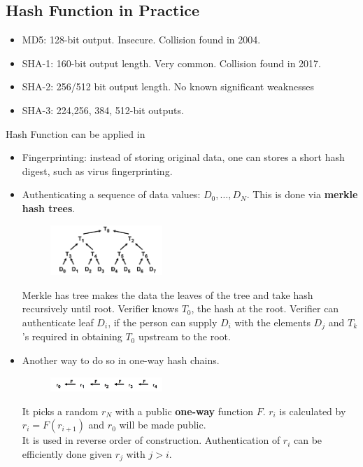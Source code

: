 \documentclass[12pt]{article}
\theoremstyle{definition}
\begin{document}
\subsection{Hash Function in Practice}
\begin{itemize}
  \item MD5: 128-bit output. Insecure. Collision found in 2004.
  \item SHA-1: 160-bit output length. Very common. Collision found in 2017.
  \item SHA-2: 256/512 bit output length. No known significant weaknesses
  \item SHA-3: 224,256, 384, 512-bit outputs.
\end{itemize}
Hash Function can be applied in 
\begin{itemize}
  \item Fingerprinting: instead of storing original data, one can stores a short hash digest, such as virus fingerprinting.
  \item Authenticating a sequence of data values: $D_0,\ldots, D_N$. This is done via \textbf{merkle hash trees}.\\
  \begin{figure}[h]
  \centering
  \includegraphics[width=0.4\textwidth]{5.png}
  \end{figure}
  Merkle has tree makes the data the leaves of the tree and take hash recursively until root. Verifier knows $T_0$, the hash at the root. Verifier can authenticate leaf $D_i$, if the person can supply $D_i$ with the elements $D_j$ and $T_k$'s required in obtaining $T_0$ upstream to the root.
  \item Another way to do so in one-way hash chains. 
  \begin{figure}[h]
  \centering
  \includegraphics[width=0.4\textwidth]{6.png}
  \end{figure}
  It picks a random $r_N$ with a public \textbf{one-way} function $F$. $r_i$ is calculated by $r_i=F(r_{i+1})$ and $r_0$ will be made public.\\
  It is used in reverse order of construction. Authentication of $r_i$ can be efficiently done given $r_j$ with $j>i$.

\end{itemize}
\end{document}
